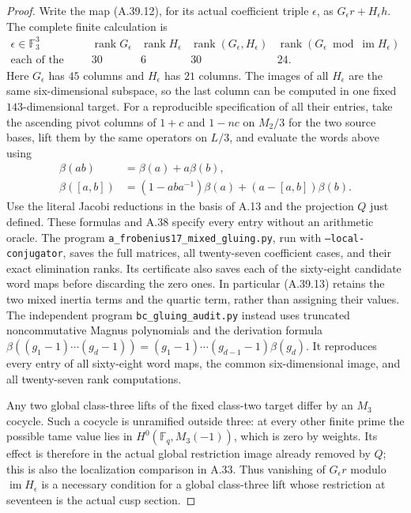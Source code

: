 \begin{proof}
Write the map (A.39.12), for its actual coefficient triple
$\epsilon$, as $G_\epsilon r+H_\epsilon h$. The complete
finite calculation is
\[
\begin{array}{c|rrrr}
 \epsilon\in\mathbb F_3^3&
 \operatorname{rank}G_\epsilon&
 \operatorname{rank}H_\epsilon&
 \operatorname{rank}(G_\epsilon,H_\epsilon)&
 \operatorname{rank}(G_\epsilon\bmod\operatorname{im}H_\epsilon)\\ \hline
 \text{each of the twenty-seven triples}&30&6&30&24.
\end{array}
 \tag{A.39.13}
\]
Here $G_\epsilon$ has $45$ columns and $H_\epsilon$ has
$21$ columns. The images of all $H_\epsilon$ are the same
six-dimensional subspace, so the last column can be computed
in one fixed $143$-dimensional target. For a reproducible
specification of all their
entries, take the ascending pivot columns of $1+c$ and
$1-nc$ on $M_2/3$ for the two source bases, lift them by the
same operators on $L/3$, and evaluate the words above using
\[
\begin{split}
 \beta(ab)&=\beta(a)+a\beta(b),\\
 \beta([a,b])&=(1-aba^{-1})\beta(a)
                         +(a-[a,b])\beta(b).
\end{split}
 \tag{A.39.14}
\]
Use the literal Jacobi reductions in the basis of A.13 and
the projection $Q$ just defined. These formulas and A.38
specify every entry without an arithmetic oracle. The program
\texttt{a\_frobenius17\_mixed\_gluing.py}, run with
\texttt{--local-conjugator}, saves the full matrices, all
twenty-seven coefficient cases, and their exact elimination
ranks. Its certificate also saves each of the sixty-eight
candidate word maps before discarding the zero ones. In
particular (A.39.13) retains the two mixed inertia terms and
the quartic term, rather than assigning their values.
The independent program \texttt{bc\_gluing\_audit.py} instead
uses truncated noncommutative Magnus polynomials and the
derivation formula
$\beta((g_1-1)\cdots(g_d-1))=
(g_1-1)\cdots(g_{d-1}-1)\beta(g_d)$.
It reproduces every entry of all sixty-eight word maps,
the common six-dimensional image, and all twenty-seven
rank computations.

Any two global class-three lifts of the fixed class-two
target differ by an $M_3$ cocycle. Such a cocycle is unramified
outside three: at every other finite prime the possible tame
value lies in $H^0(\mathbb F_q,M_3(-1))$, which is zero by
weights. Its effect is therefore in the actual global
restriction image already removed by $Q$; this is also the
localization comparison in A.33. Thus vanishing of
$G_\epsilon r$ modulo $\operatorname{im}H_\epsilon$ is a
necessary condition for a global class-three lift whose
restriction at seventeen is the actual cusp section.


\end{proof}

